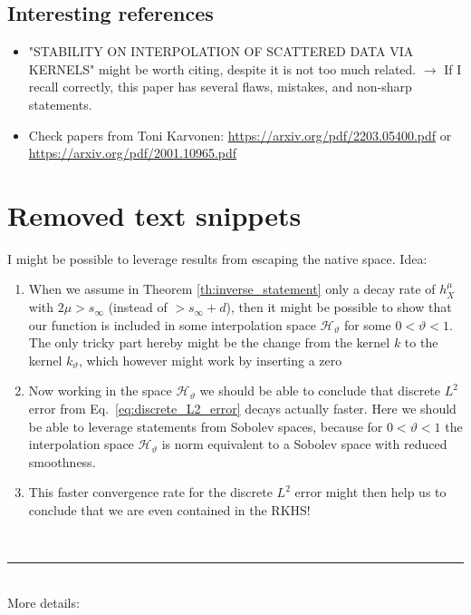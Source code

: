 \documentclass[a4paper, 10pt]{article}
\newcommand{\Ht}{\mathcal{H}_{\vartheta}}
\begin{document}
\subsection{Interesting references}

\begin{itemize}
\item "STABILITY ON INTERPOLATION OF SCATTERED DATA VIA KERNELS" might be worth citing, despite it is not too much related. $\rightarrow$ If I recall correctly, this paper has several flaws, mistakes, and non-sharp statements.
\item Check papers from Toni Karvonen: \url{https://arxiv.org/pdf/2203.05400.pdf} or \url{https://arxiv.org/pdf/2001.10965.pdf}
\end{itemize}


\section{Removed text snippets}

I might be possible to leverage results from escaping the native space. Idea:

\begin{enumerate}
\item When we assume in Theorem \ref{th:inverse_statement} only a decay rate of $h_X^\mu$ with $2\mu > s_\infty$ (instead of $> s_\infty + d$),
then it might be possible to show that our function is included in some interpolation space $\Ht$ for some $0 < \vartheta < 1$. \\
The only tricky part hereby might be the change from the kernel $k$ to the kernel $k_\vartheta$, which however might work by inserting a zero
\item Now working in the space $\Ht$ we should be able to conclude that discrete $L^2$ error from Eq.\ \eqref{eq:discrete_L2_error} decays actually faster.
Here we should be able to leverage statements from Sobolev spaces, because for $0 < \vartheta < 1$ the interpolation space $\Ht$ is norm equivalent to a Sobolev space with reduced smoothness.
\item This faster convergence rate for the discrete $L^2$ error might then help us to conclude that we are even contained in the RKHS!
\end{enumerate}

~ \\
\hrule
~ \\

\noindent More details: 
\end{document}
